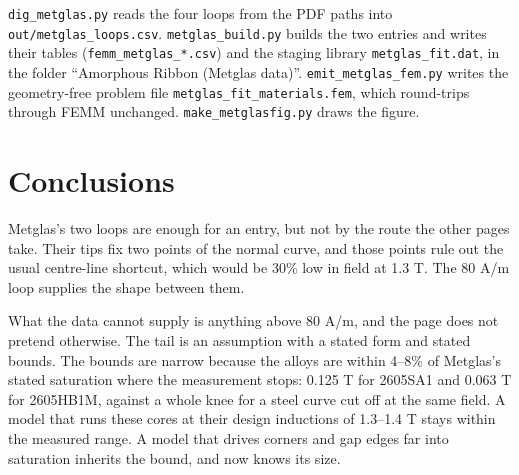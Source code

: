 \documentclass[
  11pt,
]{article}
\begin{document}
\texttt{dig\_metglas.py} reads the four loops from the PDF paths into \texttt{out/metglas\_loops.csv}. \texttt{metglas\_build.py} builds the two entries and writes their tables (\texttt{femm\_metglas\_*.csv}) and the staging library \texttt{metglas\_fit.dat}, in the folder ``Amorphous Ribbon (Metglas data)''. \texttt{emit\_metglas\_fem.py} writes the geometry-free problem file \texttt{metglas\_fit\_materials.fem}, which round-trips through FEMM unchanged. \texttt{make\_metglasfig.py} draws the figure.

\section{Conclusions}\label{conclusions}

Metglas's two loops are enough for an entry, but not by the route the other pages take. Their tips fix two points of the normal curve, and those points rule out the usual centre-line shortcut, which would be 30\% low in field at 1.3 T. The 80 A/m loop supplies the shape between them.

What the data cannot supply is anything above 80 A/m, and the page does not pretend otherwise. The tail is an assumption with a stated form and stated bounds. The bounds are narrow because the alloys are within 4--8\% of Metglas's stated saturation where the measurement stops: 0.125 T for 2605SA1 and 0.063 T for 2605HB1M, against a whole knee for a steel curve cut off at the same field. A model that runs these cores at their design inductions of 1.3--1.4 T stays within the measured range. A model that drives corners and gap edges far into saturation inherits the bound, and now knows its size.
\end{document}
